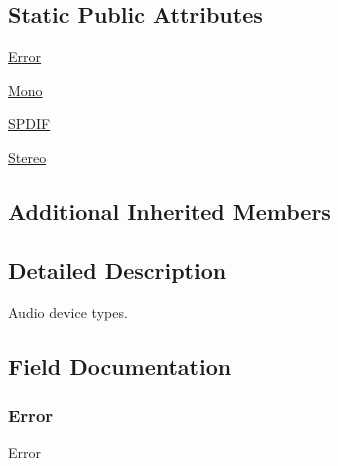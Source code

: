 \subsection*{Static Public Attributes}
\begin{DoxyCompactItemize}
\item 
\hyperlink{classvlc_1_1_audio_output_device_types_a2c3e4bb40f36b262a5214e2da2bca9c5}{Error}
\item 
\hyperlink{classvlc_1_1_audio_output_device_types_a09e03bcea0aa310eb79ccae1121dc14d}{Mono}
\item 
\hyperlink{classvlc_1_1_audio_output_device_types_ad1b39efc930cf7f961c8d60a91f044e0}{S\+P\+D\+IF}
\item 
\hyperlink{classvlc_1_1_audio_output_device_types_a0efd4e24b2435aff80b5a5bac9b6cff1}{Stereo}
\end{DoxyCompactItemize}
\subsection*{Additional Inherited Members}


\subsection{Detailed Description}
\begin{DoxyVerb}Audio device types.
\end{DoxyVerb}
 

\subsection{Field Documentation}
\mbox{\label{classvlc_1_1_audio_output_device_types_a2c3e4bb40f36b262a5214e2da2bca9c5}} 
\subsubsection{\texorpdfstring{Error}{Error}}
{\footnotesize\ttfamily Error\hspace{0.3cm}{\ttfamily [static]}}

\mbox{\label{classvlc_1_1_audio_output_device_types_a09e03bcea0aa310eb79ccae1121dc14d}} 
